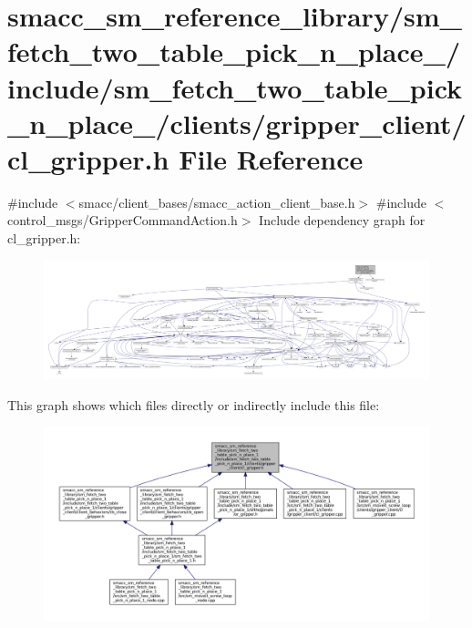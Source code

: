 \hypertarget{sm__fetch__two__table__pick__n__place__1_2include_2sm__fetch__two__table__pick__n__place__1_2clia04ff58373fc88c6872e3e7d8bbef2d3}{}\section{smacc\+\_\+sm\+\_\+reference\+\_\+library/sm\+\_\+fetch\+\_\+two\+\_\+table\+\_\+pick\+\_\+n\+\_\+place\+\_/include/sm\+\_\+fetch\+\_\+two\+\_\+table\+\_\+pick\+\_\+n\+\_\+place\+\_/clients/gripper\+\_\+client/cl\+\_\+gripper.h File Reference}
\label{sm__fetch__two__table__pick__n__place__1_2include_2sm__fetch__two__table__pick__n__place__1_2clia04ff58373fc88c6872e3e7d8bbef2d3}
{\ttfamily \#include $<$smacc/client\+\_\+bases/smacc\+\_\+action\+\_\+client\+\_\+base.\+h$>$}\newline
{\ttfamily \#include $<$control\+\_\+msgs/\+Gripper\+Command\+Action.\+h$>$}\newline
Include dependency graph for cl\+\_\+gripper.\+h\+:
\nopagebreak
\begin{figure}[H]
\begin{center}
\leavevmode
\includegraphics[width=350pt]{sm__fetch__two__table__pick__n__place__1_2include_2sm__fetch__two__table__pick__n__place__1_2clif4ab4638bd68a1cba668704abb3198e1}
\end{center}
\end{figure}
This graph shows which files directly or indirectly include this file\+:
\nopagebreak
\begin{figure}[H]
\begin{center}
\leavevmode
\includegraphics[width=350pt]{sm__fetch__two__table__pick__n__place__1_2include_2sm__fetch__two__table__pick__n__place__1_2clifae5f2e330dd8e14dbf8a0dc6a98e894}
\end{center}
\end{figure}
